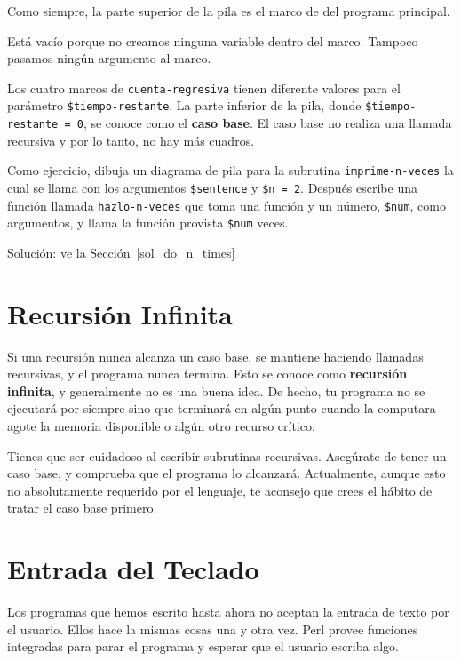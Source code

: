 Como siempre, la parte superior de la pila es el marco de
del programa principal.

Está vacío porque no creamos ninguna variable dentro del marco.
Tampoco pasamos ningún argumento al marco.

Los cuatro marcos de {\tt cuenta-regresiva} tienen diferente valores
para el parámetro {\tt \$tiempo-restante}. La parte inferior de la 
pila, donde {\tt \$tiempo-restante = 0}, se conoce como el {\bf caso base}.
El caso base no realiza una llamada recursiva y por lo tanto, no hay más
cuadros.

Como ejercicio, dibuja un diagrama de pila para la subrutina \verb|imprime-n-veces|
la cual se llama con los argumentos \verb|$sentence| y {\tt \$n = 2}.
Después escribe una función llamada \verb|hazlo-n-veces| que toma una función
y un número, {\tt \$num}, como argumentos, y llama la función 
provista {\tt \$num} veces.
\label{do_n_times}

Solución: ve la Sección~\ref{sol_do_n_times}


\section{Recursión Infinita}


Si una recursión nunca alcanza un caso base, se mantiene 
haciendo llamadas recursivas, y el programa nunca termina. Esto
se conoce como {\bf recursión infinita}, y generalmente no es 
una buena idea. De hecho, tu programa no se ejecutará por siempre
sino que terminará en algún punto cuando la computara agote la 
memoria disponible o algún otro recurso crítico.

Tienes que ser cuidadoso al escribir subrutinas recursivas. 
Asegúrate de tener un caso base, y comprueba que el programa
lo alcanzará. Actualmente, aunque esto no absolutamente requerido
por el lenguaje, te aconsejo que crees el hábito de tratar 
el caso base primero.

\section{Entrada del Teclado}

Los programas que hemos escrito hasta ahora no aceptan la
entrada de texto por el usuario. Ellos hace la mismas cosas
una y otra vez. Perl provee funciones integradas para parar
el programa y esperar que el usuario escriba algo.

